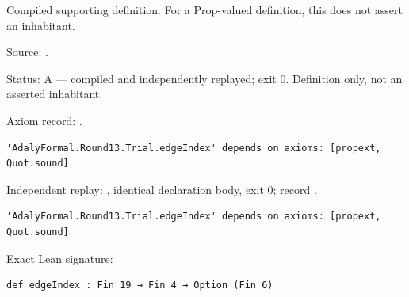 \begin{definition}[bp-422]
\label{bp-422}
\uses{}
\leanok
Compiled supporting definition. For a Prop-valued definition, this does not assert an inhabitant.

\par Source: \texttt{}.
\par Status: A — compiled and independently replayed; exit 0. Definition only, not an asserted inhabitant.
\par Axiom record: \texttt{}.
\begin{verbatim}
'AdalyFormal.Round13.Trial.edgeIndex' depends on axioms: [propext, Quot.sound]
\end{verbatim}
\par Independent replay: \texttt{}, identical declaration body, exit 0; record \texttt{}.
\begin{verbatim}
'AdalyFormal.Round13.Trial.edgeIndex' depends on axioms: [propext, Quot.sound]
\end{verbatim}
\par Exact Lean signature:
\begin{verbatim}
def edgeIndex : Fin 19 → Fin 4 → Option (Fin 6)
\end{verbatim}
\end{definition}

